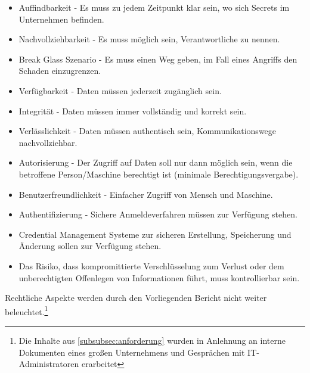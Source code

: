 \documentclass[
a4paper,   
titlepage,  
halfparskip,
12pt        
]{scrartcl}
\begin{document}
\begin{onehalfspacing}
\begin{itemize}
  \item Auffindbarkeit - Es muss zu jedem Zeitpunkt klar sein, wo sich Secrets im Unternehmen befinden.
  \item Nachvollziehbarkeit - Es muss möglich sein, Verantwortliche zu nennen.
  \item Break Glass Szenario - Es muss einen Weg geben, im Fall eines Angriffs den Schaden einzugrenzen.
  \item Verfügbarkeit - Daten müssen jederzeit zugänglich sein.
  \item Integrität - Daten müssen immer vollständig und korrekt sein.
  \item Verlässlichkeit - Daten müssen authentisch sein, Kommunikationswege nachvollziehbar.
  \item Autorisierung - Der Zugriff auf Daten soll nur dann möglich sein, wenn die betroffene Person/Maschine berechtigt ist (minimale Berechtigungsvergabe).
  \item Benutzerfreundlichkeit - Einfacher Zugriff von Mensch und Maschine.
  \item Authentifizierung - Sichere Anmeldeverfahren müssen zur Verfügung stehen.
  \item Credential Management Systeme zur sicheren Erstellung, Speicherung und Änderung sollen zur Verfügung stehen.
  \item Das Risiko, dass kompromittierte Verschlüsselung zum Verlust oder dem unberechtigten Offenlegen von Informationen führt, muss kontrollierbar sein.
\end{itemize}

Rechtliche Aspekte werden durch den Vorliegenden Bericht nicht weiter beleuchtet.\footnote{Die Inhalte aus \autoref{subsubsec:anforderung} wurden in Anlehnung an interne Dokumenten eines großen Unternehmens und Gesprächen mit \ac{IT}-Administratoren erarbeitet}


\end{onehalfspacing}
\end{document}
